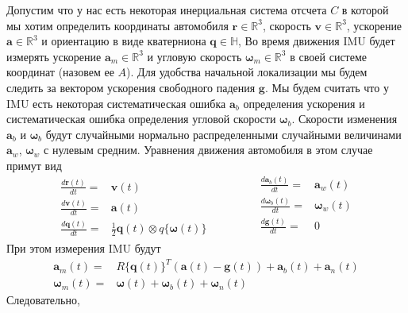 \documentclass[12pt]{article}
\begin{document}
Допустим что у нас есть некоторая инерциальная система отсчета $C$ в которой мы
хотим определить координаты автомобиля $\pmb{r}\in\mathbb{R}^3$,
скорость $\pmb{v}\in\mathbb{R}^3$, ускорение $\pmb{a}\in\mathbb{R}^3$ и
ориентацию в виде кватерниона $\pmb{q}\in\mathbb{H}$,
Во время движения IMU будет измерять ускорение $\pmb{a}_m\in\mathbb{R}^3$ и
угловую скорость $\pmb{\omega}_m\in\mathbb{R}^3$ в своей системе координат
(назовем ее $A$). Для удобства начальной локализации мы будем следить
за вектором ускорения свободного падения $\pmb{g}$. Мы будем считать что
у IMU есть некоторая систематическая ошибка $\pmb{a}_b$ определения ускорения
и систематическая ошибка определения угловой скорости $\pmb{\omega}_b$. Скорости
изменения $\pmb{a}_b$ и $\pmb{\omega}_b$ будут случайными нормально
распределенными случайными величинами $\pmb{a}_w$, $\pmb{\omega}_w$ с нулевым
средним. Уравнения движения автомобиля в этом случае примут вид
\begin{equation}
    \begin{aligned}
        \frac{d \pmb{r}(t)}{d t}= & \pmb{v}(t)                                          \\
        \frac{d \pmb{v}(t)}{d t}= & \pmb{a}(t)                                          \\
        \frac{d \pmb{q}(t)}{d t}= & \frac{1}{2} \pmb{q}(t) \otimes q\{\pmb{\omega}(t)\}
    \end{aligned}
    \qquad \qquad
    \begin{aligned}
        \frac{d \pmb{a}_b(t)}{d t}=      & \pmb{a}_w(t)      \\
        \frac{d \pmb{\omega}_b(t)}{d t}= & \pmb{\omega}_w(t) \\
        \frac{d \pmb{g}(t)}{d t}=        & 0                 \\
    \end{aligned}
\end{equation}
При этом измерения IMU будут
\begin{equation}
    \begin{aligned}
        \pmb{a}_m(t)=      & R\{\pmb{q}(t)\}^T(\pmb{a}(t) - \pmb{g}(t)) + \pmb{a}_b(t) + \pmb{a}_n(t) \\
        \pmb{\omega}_m(t)= & \pmb{\omega}(t) + \pmb{\omega}_b(t) + \pmb{\omega}_n(t)
    \end{aligned}
\end{equation}
Следовательно,
\end{document}
